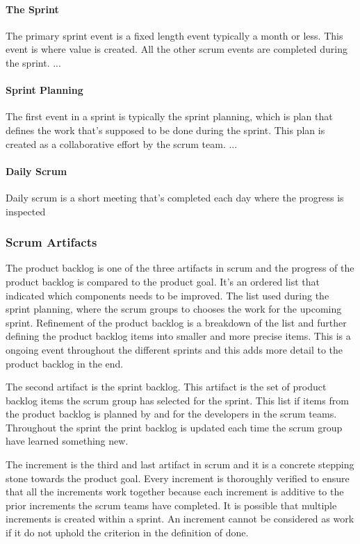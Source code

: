 \paragraph{The Sprint}
The primary sprint event is a fixed length event typically a month or less. This event is where value is created.
All the other scrum events are completed during the sprint.
...\cite{schwaber_sutherland_2022}

\paragraph{Sprint Planning}
The first event in a sprint is typically the sprint planning, which is plan that defines the work that's supposed to be done during the sprint.
This plan is created as a collaborative effort by the scrum team.
...

\paragraph{Daily Scrum}
Daily scrum is a short meeting that's completed each day where the progress is inspected 


\subsubsection{Scrum Artifacts}
The product backlog is one of the three artifacts in scrum and the progress of the product backlog is compared to the product goal.
It's an ordered list that indicated which components needs to be improved.
The list used during the sprint planning, where the scrum groups to chooses the work for the upcoming sprint.
Refinement of the product backlog is a breakdown of the list and further defining the product backlog items into smaller and more precise items.
This is a ongoing event throughout the different sprints and this adds more detail to the product backlog in the end. \cite{schwaber_sutherland_2022}

The second artifact is the sprint backlog. 
This artifact is the set of product backlog items the scrum group has selected for the sprint. 
This list if items from the product backlog is planned by and for the developers in the scrum teams. 
Throughout the sprint the print backlog is updated each time the scrum group have learned something new. \cite{schwaber_sutherland_2022}

The increment is the third and last artifact in scrum and it is a concrete stepping stone towards the product goal.
Every increment is thoroughly verified to ensure that all the increments work together because each increment is additive to the prior increments the scrum teams have completed.
It is possible that multiple increments is created within a sprint.
An increment cannot be considered as work if it do not uphold the criterion in the definition of done. \cite{schwaber_sutherland_2022}


